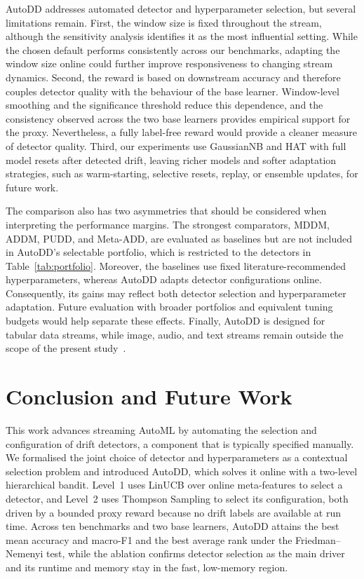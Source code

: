 \documentclass[conference]{IEEEtran}
\begin{document}
AutoDD addresses automated detector and hyperparameter selection, but several limitations remain. First, the window size is fixed throughout the stream, although the sensitivity analysis identifies it as the most influential setting. While the chosen default performs consistently across our benchmarks, adapting the window size online could further improve responsiveness to changing stream dynamics. Second, the reward is based on downstream accuracy and therefore couples detector quality with the behaviour of the base learner. Window-level smoothing and the significance threshold reduce this dependence, and the consistency observed across the two base learners provides empirical support for the proxy. Nevertheless, a fully label-free reward would provide a cleaner measure of detector quality. Third, our experiments use GaussianNB and HAT with full model resets after detected drift, leaving richer models and softer adaptation strategies, such as warm-starting, selective resets, replay, or ensemble updates, for future work.

The comparison also has two asymmetries that should be considered when interpreting the performance margins. The strongest comparators, MDDM, ADDM, PUDD, and Meta-ADD, are evaluated as baselines but are not included in AutoDD's selectable portfolio, which is restricted to the detectors in Table~\ref{tab:portfolio}. Moreover, the baselines use fixed literature-recommended hyperparameters, whereas AutoDD adapts detector configurations online. Consequently, its gains may reflect both detector selection and hyperparameter adaptation. Future evaluation with broader portfolios and equivalent tuning budgets would help separate these effects. Finally, AutoDD is designed for tabular data streams, while image, audio, and text streams remain outside the scope of the present study~\cite{Souza2021IBDD}.

\section{Conclusion and Future Work}
\label{sec:conclusion}

This work advances streaming AutoML by automating the selection and configuration of drift detectors, a component that is typically specified manually. We formalised the joint choice of detector and hyperparameters as a contextual selection problem and introduced AutoDD, which solves it online with a two-level hierarchical bandit. Level~1 uses LinUCB over online meta-features to select a detector, and Level~2 uses Thompson Sampling to select its configuration, both driven by a bounded proxy reward because no drift labels are available at run time. Across ten benchmarks and two base learners, AutoDD attains the best mean accuracy and macro-F1 and the best average rank under the Friedman--Nemenyi test, while the ablation confirms detector selection as the main driver and its runtime and memory stay in the fast, low-memory region.
\end{document}
